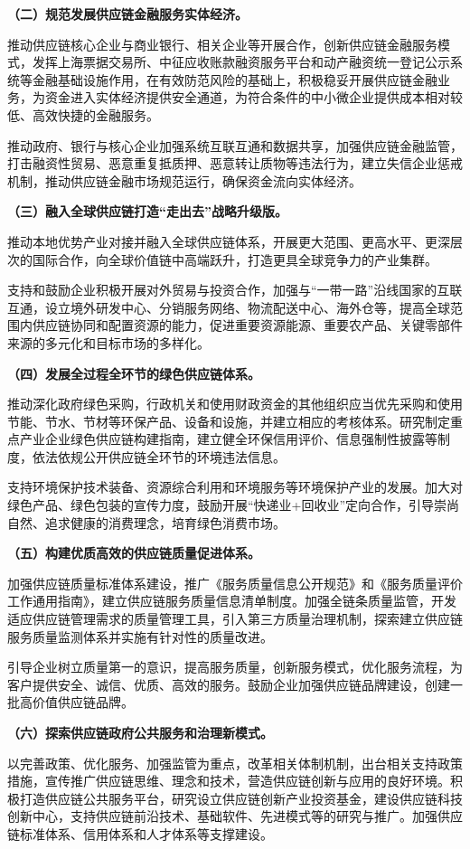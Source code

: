 { \bf （二）规范发展供应链金融服务实体经济。 }

推动供应链核心企业与商业银行、相关企业等开展合作，创新供应链金融服务模式，发挥上海票据交易所、中征应收账款融资服务平台和动产融资统一登记公示系统等金融基础设施作用，在有效防范风险的基础上，积极稳妥开展供应链金融业务，为资金进入实体经济提供安全通道，为符合条件的中小微企业提供成本相对较低、高效快捷的金融服务。

推动政府、银行与核心企业加强系统互联互通和数据共享，加强供应链金融监管，打击融资性贸易、恶意重复抵质押、恶意转让质物等违法行为，建立失信企业惩戒机制，推动供应链金融市场规范运行，确保资金流向实体经济。

{ \bf （三）融入全球供应链打造“走出去”战略升级版。 }

推动本地优势产业对接并融入全球供应链体系，开展更大范围、更高水平、更深层次的国际合作，向全球价值链中高端跃升，打造更具全球竞争力的产业集群。

支持和鼓励企业积极开展对外贸易与投资合作，加强与“一带一路”沿线国家的互联互通，设立境外研发中心、分销服务网络、物流配送中心、海外仓等，提高全球范围内供应链协同和配置资源的能力，促进重要资源能源、重要农产品、关键零部件来源的多元化和目标市场的多样化。

{ \bf （四）发展全过程全环节的绿色供应链体系。 }

推动深化政府绿色采购，行政机关和使用财政资金的其他组织应当优先采购和使用节能、节水、节材等环保产品、设备和设施，并建立相应的考核体系。研究制定重点产业企业绿色供应链构建指南，建立健全环保信用评价、信息强制性披露等制度，依法依规公开供应链全环节的环境违法信息。

支持环境保护技术装备、资源综合利用和环境服务等环境保护产业的发展。加大对绿色产品、绿色包装的宣传力度，鼓励开展“快递业+回收业”定向合作，引导崇尚自然、追求健康的消费理念，培育绿色消费市场。

{ \bf （五）构建优质高效的供应链质量促进体系。 }

加强供应链质量标准体系建设，推广《服务质量信息公开规范》和《服务质量评价工作通用指南》，建立供应链服务质量信息清单制度。加强全链条质量监管，开发适应供应链管理需求的质量管理工具，引入第三方质量治理机制，探索建立供应链服务质量监测体系并实施有针对性的质量改进。

引导企业树立质量第一的意识，提高服务质量，创新服务模式，优化服务流程，为客户提供安全、诚信、优质、高效的服务。鼓励企业加强供应链品牌建设，创建一批高价值供应链品牌。

{ \bf （六）探索供应链政府公共服务和治理新模式。 }

以完善政策、优化服务、加强监管为重点，改革相关体制机制，出台相关支持政策措施，宣传推广供应链思维、理念和技术，营造供应链创新与应用的良好环境。积极打造供应链公共服务平台，研究设立供应链创新产业投资基金，建设供应链科技创新中心，支持供应链前沿技术、基础软件、先进模式等的研究与推广。加强供应链标准体系、信用体系和人才体系等支撑建设。

